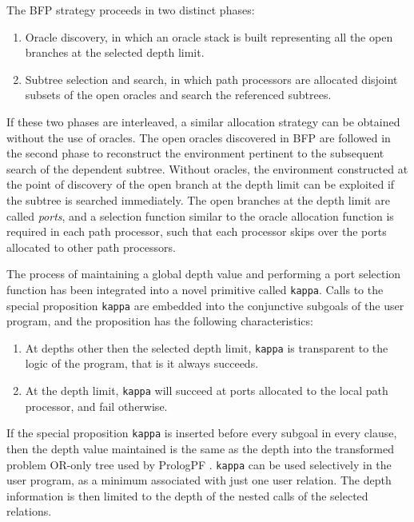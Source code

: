 The BFP strategy proceeds in two distinct phases:
\begin{enumerate}
\item{Oracle discovery, in which an oracle stack is built representing all the
  open branches at the selected depth limit.}
\item{Subtree selection and search, in which path processors are allocated disjoint
  subsets of the open oracles and search the referenced subtrees.}
\end{enumerate}

If these two phases are interleaved, a similar allocation strategy can be obtained
without the use of oracles.  The open oracles discovered in BFP are followed in the
second phase to reconstruct the environment pertinent to the subsequent search of
the dependent subtree.  Without oracles, the environment constructed at the point of
discovery of the open branch at the depth limit can be exploited if the
subtree is searched immediately.  The open branches at the depth limit are called
\textit{ports}, and a selection function similar to the oracle allocation function
is required in each path processor, such that each processor skips over the ports
allocated to other path processors.

The process of maintaining a global depth value and performing a port selection
function has been integrated into a novel primitive called \texttt{kappa}.  Calls
to the special proposition \texttt{kappa} are embedded into the 
conjunctive subgoals of the user program, and
the proposition has the following characteristics:
\begin{enumerate}
\item{At depths other then the selected depth limit, \texttt{kappa} is transparent to
  the logic of the program, that is it always succeeds.}
\item{At the depth limit, \texttt{kappa} will succeed at ports allocated to the local
  path processor, and fail otherwise.}
\end{enumerate}

If the special proposition \texttt{kappa} is inserted before every subgoal in every
clause, then the depth value maintained is the same as the depth into the transformed
problem OR-only tree used by PrologPF \cite{Sar95}.  \texttt{kappa} can be used
selectively in the user program, as a minimum associated with just one user relation.
The depth information is then limited to the depth of the nested calls of the
selected relations.
\enlargethispage{\baselineskip}  %

